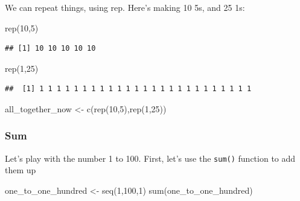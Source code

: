 \documentclass[
]{book}
\newenvironment{Shaded}{\begin{snugshade}}{\end{snugshade}}
\newcommand{\DecValTok}[1]{\textcolor[rgb]{0.00,0.00,0.81}{#1}}
\newcommand{\FunctionTok}[1]{\textcolor[rgb]{0.00,0.00,0.00}{#1}}
\newcommand{\NormalTok}[1]{#1}
\newcommand{\OtherTok}[1]{\textcolor[rgb]{0.56,0.35,0.01}{#1}}
\begin{document}
We can repeat things, using rep. Here's making 10 5s, and 25 1s:

\begin{Shaded}
\begin{Highlighting}[]
\FunctionTok{rep}\NormalTok{(}\DecValTok{10}\NormalTok{,}\DecValTok{5}\NormalTok{)}
\end{Highlighting}
\end{Shaded}

\begin{verbatim}
## [1] 10 10 10 10 10
\end{verbatim}

\begin{Shaded}
\begin{Highlighting}[]
\FunctionTok{rep}\NormalTok{(}\DecValTok{1}\NormalTok{,}\DecValTok{25}\NormalTok{)}
\end{Highlighting}
\end{Shaded}

\begin{verbatim}
##  [1] 1 1 1 1 1 1 1 1 1 1 1 1 1 1 1 1 1 1 1 1 1 1 1 1 1
\end{verbatim}

\begin{Shaded}
\begin{Highlighting}[]
\NormalTok{all\_together\_now }\OtherTok{\textless{}{-}} \FunctionTok{c}\NormalTok{(}\FunctionTok{rep}\NormalTok{(}\DecValTok{10}\NormalTok{,}\DecValTok{5}\NormalTok{),}\FunctionTok{rep}\NormalTok{(}\DecValTok{1}\NormalTok{,}\DecValTok{25}\NormalTok{)) }
\end{Highlighting}
\end{Shaded}

\hypertarget{sum}{%
\subsubsection{Sum}\label{sum}}

Let's play with the number 1 to 100. First, let's use the \texttt{sum()} function to add them up

\begin{Shaded}
\begin{Highlighting}[]
\NormalTok{one\_to\_one\_hundred }\OtherTok{\textless{}{-}} \FunctionTok{seq}\NormalTok{(}\DecValTok{1}\NormalTok{,}\DecValTok{100}\NormalTok{,}\DecValTok{1}\NormalTok{)}
\FunctionTok{sum}\NormalTok{(one\_to\_one\_hundred)}
\end{Highlighting}
\end{Shaded}
\end{document}
